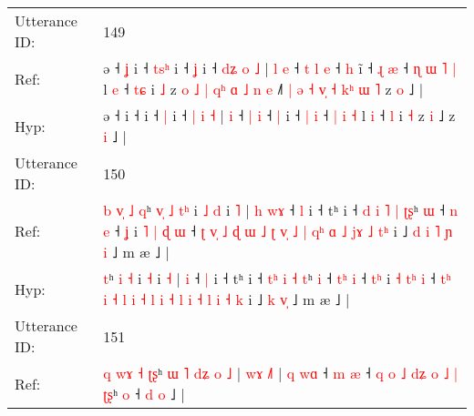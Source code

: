 \documentclass[10pt]{article}
\DeclareRobustCommand{\hl}[1]{{\textcolor{red}{#1}}}
\begin{document}
\begin{longtable}{ll}
 \\
\midrule
Utterance ID: & 149 \\
Ref: & ə ˧\hl{ }\hl{ʝ} i ˧\hl{ }\hl{t}\hl{s}\hl{ʰ} i ˧ \hl{ʝ} i ˧ \hl{d}\hl{ʑ} \hl{o} \hl{˩} |\hl{ }\hl{l} \hl{e} ˧\hl{ }\hl{t} \hl{l} \hl{e} ˧ \hl{h} i\hl{̃} ˧ \hl{ɻ} \hl{æ} ˧\hl{ }\hl{ɳ} \hl{ɯ} \hl{˥} \hl{|} l \hl{e} ˧ \hl{t}\hl{ɕ} i \hl{˩} z\hl{ }\hl{o}\hl{ }\hl{˩}\hl{ }\hl{|}\hl{ }\hl{q}\hl{ʰ}\hl{ }\hl{ɑ}\hl{ }\hl{˩}\hl{ }\hl{n} \hl{e} ˩\hl{˥}\hl{ }\hl{|}\hl{ }\hl{ə}\hl{ }\hl{˧}\hl{ }\hl{v}\hl{̩}\hl{ }\hl{˧}\hl{ }\hl{k}\hl{ʰ}\hl{ }\hl{ɯ}\hl{ }\hl{˥} z \hl{o} ˩ |
 \\
Hyp: & ə ˧\hl{}\hl{} i ˧\hl{}\hl{}\hl{}\hl{} i ˧ \hl{|} i ˧ \hl{}\hl{|} \hl{i} \hl{˧} |\hl{}\hl{} \hl{i} ˧\hl{}\hl{} \hl{|} \hl{i} ˧ \hl{|} i\hl{} ˧ \hl{|} \hl{i} ˧\hl{}\hl{} \hl{|} \hl{i} \hl{˧} l \hl{i} ˧ \hl{}\hl{l} i \hl{˧} z\hl{}\hl{}\hl{}\hl{}\hl{}\hl{}\hl{}\hl{}\hl{}\hl{}\hl{}\hl{}\hl{}\hl{}\hl{} \hl{i} ˩\hl{}\hl{}\hl{}\hl{}\hl{}\hl{}\hl{}\hl{}\hl{}\hl{}\hl{}\hl{}\hl{}\hl{}\hl{}\hl{}\hl{}\hl{}\hl{} z \hl{i} ˩ |
 \\
\midrule
Utterance ID: & 150 \\
Ref: & \hl{b}\hl{ }\hl{v}\hl{̩}\hl{ }\hl{˩}\hl{ }\hl{q}ʰ\hl{ }\hl{v}\hl{̩} \hl{˩} \hl{t}\hl{ʰ} i\hl{ }\hl{˩} \hl{d} i \hl{˥} |\hl{ }\hl{h} \hl{w}\hl{ɤ} ˧ \hl{l} i ˧ tʰ i ˧ \hl{d}\hl{ }\hl{i} \hl{˥} \hl{|} \hl{ʈ}\hl{ʂ}ʰ \hl{ɯ} ˧ \hl{}\hl{n} \hl{e} ˧ \hl{}\hl{ʝ} i \hl{˥} \hl{|}\hl{ }\hl{ɖ} \hl{ɯ} ˧ \hl{ʈ}\hl{ }\hl{v}\hl{̩} \hl{˩} \hl{ɖ} \hl{ɯ} \hl{˩} \hl{ʈ} \hl{v}\hl{̩} \hl{˩} \hl{|} \hl{q}\hl{ʰ} \hl{ɑ} \hl{˩} \hl{j}\hl{ɤ} \hl{˩} \hl{t}\hl{ʰ} i ˩\hl{ }\hl{d}\hl{ }\hl{i} \hl{˥} \hl{ɲ}\hl{ }\hl{i} ˩ m æ ˩ |
 \\
Hyp: & \hl{}\hl{}\hl{}\hl{}\hl{}\hl{}\hl{}\hl{t}ʰ\hl{}\hl{}\hl{} \hl{i} \hl{}\hl{˧} i\hl{}\hl{} \hl{˧} i \hl{˧} |\hl{}\hl{} \hl{}\hl{i} ˧ \hl{|} i ˧ tʰ i ˧ \hl{}\hl{t}\hl{ʰ} \hl{i} \hl{˧} \hl{}\hl{t}ʰ \hl{i} ˧ \hl{t}\hl{ʰ} \hl{i} ˧ \hl{t}\hl{ʰ} i \hl{˧} \hl{}\hl{t}\hl{ʰ} \hl{i} ˧ \hl{t}\hl{ʰ}\hl{ }\hl{i} \hl{˧} \hl{l} \hl{i} \hl{˧} \hl{l} \hl{}\hl{i} \hl{˧} \hl{l} \hl{}\hl{i} \hl{˧} \hl{l} \hl{}\hl{i} \hl{˧} \hl{}\hl{k} i ˩\hl{}\hl{}\hl{}\hl{} \hl{k} \hl{}\hl{v}\hl{̩} ˩ m æ ˩ |
 \\
\midrule
Utterance ID: & 151 \\
Ref: & \hl{q}\hl{ }\hl{w}\hl{ɤ}\hl{ }\hl{˧}\hl{ }\hl{ʈ}\hl{ʂ}ʰ\hl{ }\hl{ɯ} \hl{˥} \hl{d}\hl{ʑ} \hl{o} \hl{˩} | \hl{w}\hl{ɤ} \hl{˩}\hl{˥} |\hl{ }\hl{q} \hl{w}\hl{ɑ} ˧ \hl{m} \hl{æ} ˧\hl{ }\hl{q}\hl{ }\hl{o}\hl{ }\hl{˩} \hl{d}\hl{ʑ}\hl{ }\hl{o} \hl{˩} \hl{|} \hl{ʈ}\hl{ʂ}ʰ \hl{o} ˧ \hl{}\hl{d} \hl{o} ˩ |

\end{longtable}
\end{document}
